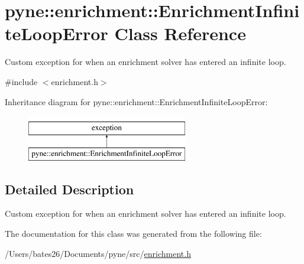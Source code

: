 \hypertarget{classpyne_1_1enrichment_1_1_enrichment_infinite_loop_error}{\section{pyne\+:\+:enrichment\+:\+:Enrichment\+Infinite\+Loop\+Error Class Reference}
\label{classpyne_1_1enrichment_1_1_enrichment_infinite_loop_error}
}


Custom exception for when an enrichment solver has entered an infinite loop.  




{\ttfamily \#include $<$enrichment.\+h$>$}

Inheritance diagram for pyne\+:\+:enrichment\+:\+:Enrichment\+Infinite\+Loop\+Error\+:\begin{figure}[H]
\begin{center}
\leavevmode
\includegraphics[height=2.000000cm]{classpyne_1_1enrichment_1_1_enrichment_infinite_loop_error}
\end{center}
\end{figure}


\subsection{Detailed Description}
Custom exception for when an enrichment solver has entered an infinite loop. 

The documentation for this class was generated from the following file\+:\begin{DoxyCompactItemize}
\item 
/\+Users/bates26/\+Documents/pyne/src/\hyperlink{enrichment_8h}{enrichment.\+h}\end{DoxyCompactItemize}
